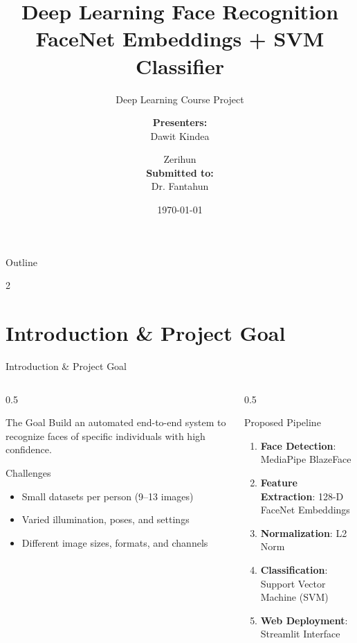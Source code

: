 \documentclass[aspectratio=169]{beamer}
\title[Face Recognition]{%
  \textbf{Deep Learning Face Recognition}\\[0.3em]
  {\large FaceNet Embeddings + SVM Classifier}
}
\subtitle{Deep Learning Course Project}
\author[Dawit \& Zerihun]{%
  \textbf{Presenters:}\\
  Dawit Kindea \and Zerihun\\[0.5em]
  \textbf{Submitted to:}\\
  Dr. Fantahun
}
\institute[AAU]{%
  Department of Computer Science\\
  Addis Ababa University
}
\date{\today}
\begin{document}

{
\begin{frame}[plain]
  \titlepage
\end{frame}
}

\begin{frame}{Outline}
  \begin{multicols}{2}
    \tableofcontents
  \end{multicols}
\end{frame}

\section{Introduction \& Project Goal}

\begin{frame}{Introduction \& Project Goal}
  \begin{columns}
    \begin{column}{0.5\textwidth}
      \begin{block}{The Goal}
        Build an automated end-to-end system to recognize faces of specific individuals with high confidence.
      \end{block}
      \begin{block}{Challenges}
        \begin{itemize}
          \item Small datasets per person (9--13 images)
          \item Varied illumination, poses, and settings
          \item Different image sizes, formats, and channels
        \end{itemize}
      \end{block}
    \end{column}
    \begin{column}{0.5\textwidth}
      \begin{block}{Proposed Pipeline}
        \begin{enumerate}
          \item \textbf{Face Detection}: MediaPipe BlazeFace
          \item \textbf{Feature Extraction}: 128-D FaceNet Embeddings
          \item \textbf{Normalization}: L2 Norm
          \item \textbf{Classification}: Support Vector Machine (SVM)
          \item \textbf{Web Deployment}: Streamlit Interface
        \end{enumerate}
      \end{block}
    \end{column}
  \end{columns}
\end{frame}
\end{document}
